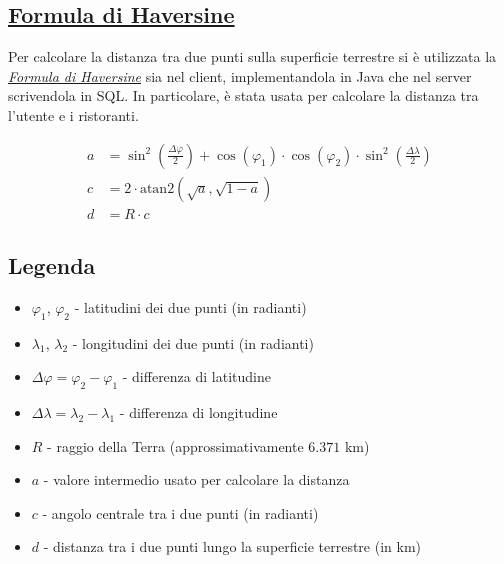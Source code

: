 \subsection{\href{https://rosettacode.org/wiki/Haversine_formula}{Formula di Haversine}}
Per calcolare la distanza tra due punti sulla superficie terrestre
si è utilizzata la \href{https://rosettacode.org/wiki/Haversine_formula}{\textit{Formula di Haversine}} sia nel client, 
implementandola in Java che nel server scrivendola in SQL.
In particolare, è stata usata per calcolare la distanza tra 
l'utente e i ristoranti.

\begin{align*}
a &= \sin^2\left(\frac{\Delta\varphi}{2}\right) + \cos(\varphi_1) \cdot \cos(\varphi_2) \cdot \sin^2\left(\frac{\Delta\lambda}{2}\right) \\
c &= 2 \cdot \mathrm{atan2}\left(\sqrt{a}, \sqrt{1 - a}\right) \\
d &= R \cdot c
\end{align*}

\subsection*{Legenda}

\begin{itemize}
  \item $\varphi_1$, $\varphi_2$ - latitudini dei due punti (in radianti)
  \item $\lambda_1$, $\lambda_2$ - longitudini dei due punti (in radianti)
  \item $\Delta\varphi = \varphi_2 - \varphi_1$ - differenza di latitudine
  \item $\Delta\lambda = \lambda_2 - \lambda_1$ - differenza di longitudine
  \item $R$ - raggio della Terra (approssimativamente $6.371$ km)
  \item $a$ - valore intermedio usato per calcolare la distanza
  \item $c$ - angolo centrale tra i due punti (in radianti)
  \item $d$ - distanza tra i due punti lungo la superficie terrestre (in km)
\end{itemize}
